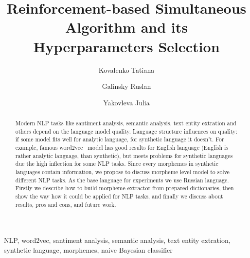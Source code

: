 \documentclass{svproc}
\begin{document}
\mainmatter              %
\title{Reinforcement-based Simultaneous Algorithm and its
Hyperparameters Selection}
%
%
\author{Kovalenko Tatiana\and Galinsky Ruslan \and Yakovleva Julia}
%
%
%
%

\maketitle

\begin{abstract}
Modern NLP tasks like santiment analysis, semantic analysis, text entity extration and others depend on the language model quality. Language structure influences on quality: if some model fits well for analytic language, for synthetic language it doesn't. For example, famous word2vec~\cite{w2v} model has good results for English language (English is rather analytic language, than synthetic), but meets problems for synthetic languages due the high inflection for some NLP tasks. Since every morphemes in synthetic languages contain information, we propose to discuss morpheme level model to solve different NLP tasks. As the base language for experiments we use Russian language. Firstly we describe how to build morpheme extractor from prepared dictionaries, then show the way how it could be applied for NLP tasks, and finally we discuss about results, pros and cons, and future work.
\end{abstract}
\begin{keywords}
NLP, word2vec, santiment analysis, semantic analysis, text entity extration, synthetic language, morphemes, naive Bayesian classifier
\end{keywords}
\end{document}
